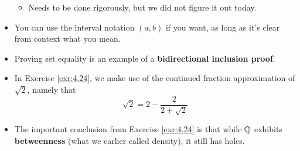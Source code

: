 \documentclass[titlepage]{report}
\begin{document}
\begin{itemize}
\begin{itemize}
        \item Needs to be done rigorously, but we did not figure it out today.
    \end{itemize}
    \item You can use the interval notation $(a,b)$ if you want, as long as it's clear from context what you mean.
    \item {}Proving set equality is an example of a \textbf{bidirectional inclusion proof}.
    \item In Exercise \ref{exr:4.24}, we make use of the continued fraction approximation of $\sqrt{2}$, namely that
    \begin{equation*}
        \sqrt{2} = 2-\frac{2}{2+\sqrt{2}}
    \end{equation*}
    \item The important conclusion from Exercise \ref{exr:4.24} is that while $\mathbb{Q}$ exhibits \textbf{betweenness} (what we earlier called density), it still has holes.
\end{itemize}




\end{document}
